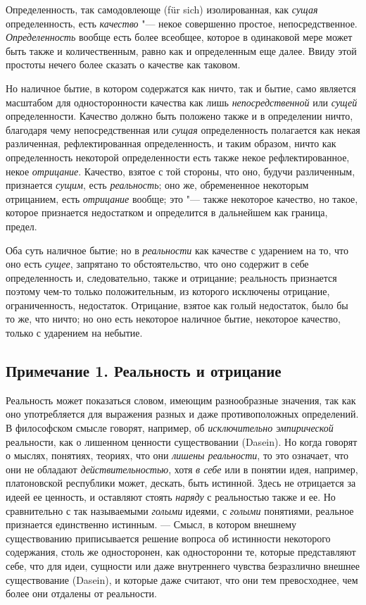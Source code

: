Определенность, так самодовлеюще (für sich) изолированная, как
{\em сущая} определенность, есть
{\em качество} "--- некое совершенно простое,
непосредственное. {\em Определенность} вообще есть
более всеобщее, которое в одинаковой мере может быть также и
количественным, равно как и определенным еще далее. Ввиду этой простоты
нечего более сказать о качестве как таковом.

Но наличное бытие, в котором содержатся как ничто, так и бытие, само
является масштабом для односторонности качества как лишь
{\em непосредственной} или
{\em сущей} определенности. Качество должно быть
положено также и в определении ничто, благодаря чему непосредственная или
{\em сущая} определенность полагается как некая
различенная, рефлектированная определенность, и таким образом, ничто как
определенность некоторой определенности есть также некое рефлектированное,
некое {\em отрицание}. Качество, взятое с той стороны,
что оно, будучи различенным, признается {\em сущим},
есть {\em реальность}; оно же, обремененное некоторым
отрицанием, есть {\em отрицание} вообще; это "--- также
некоторое качество, но такое, которое признается недостатком и определится
в дальнейшем как граница, предел.

Оба суть наличное бытие; но в {\em реальности} как
качестве с ударением на то, что оно есть {\em сущее},
запрятано то обстоятельство, что оно содержит в себе определенность и,
следовательно, также и отрицание; реальность признается поэтому чем-то
только положительным, из которого исключены отрицание, ограниченность,
недостаток. Отрицание, взятое как голый недостаток, было бы то же, что
ничто; но оно есть некоторое наличное бытие, некоторое качество, только с
ударением на небытие.

\subsection*{Примечание 1. Реальность и отрицание}

Реальность может показаться словом, имеющим разнообразные значения, так как
оно употребляется для выражения разных и даже противоположных определений.
В философском смысле говорят, например, об
{\em исключительно эмпирической} реальности, как о
лишенном ценности существовании (Dasein). Но когда говорят о мыслях,
понятиях, теориях, что они {\em лишены реальности}, то
это означает, что они не обладают
{\em действительностью}, хотя
{\em в себе} или в понятии идея, например, платоновской
республики может, дескать, быть истинной. Здесь не отрицается за идеей ее
ценность, и оставляют стоять {\em наряду} с реальностью
также и ее. Но сравнительно с так называемыми
{\em голыми} идеями, с {\em голыми}
понятиями, реальное признается единственно истинным. — Смысл, в котором
внешнему существованию приписывается решение вопроса об истинности
некоторого содержания, столь же односторонен, как односторонни те, которые
представляют себе, что для идеи, сущности или даже внутреннего чувства
безразлично внешнее существование (Dasein), и которые даже считают, что они
тем превосходнее, чем более они отдалены от реальности.

